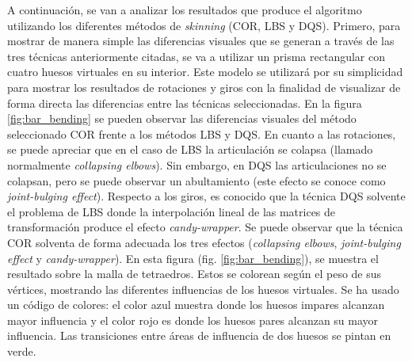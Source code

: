 




A continuación, se van a analizar los resultados que produce el algoritmo utilizando los diferentes métodos de \emph{skinning} (\ac{COR}, \ac{LBS} y \ac{DQS}).
%
Primero, para mostrar de manera simple las diferencias visuales que se generan a través de las tres técnicas anteriormente citadas, se va a utilizar un prisma rectangular con cuatro huesos virtuales en su interior. Este modelo  se utilizará por su simplicidad para mostrar los resultados de rotaciones y giros con la finalidad de visualizar de forma directa las diferencias entre las técnicas seleccionadas. En la figura \ref{fig:bar_bending} se pueden observar las diferencias visuales del método seleccionado \ac{COR} frente a los métodos \ac{LBS} y \ac{DQS}. En cuanto a las rotaciones, se puede apreciar que en el caso de \ac{LBS} la articulación se colapsa (llamado normalmente \emph{collapsing elbows}). Sin embargo, en \ac{DQS} las articulaciones no se colapsan, pero se puede observar un abultamiento (este efecto se conoce como \emph{joint-bulging effect}). Respecto a los giros, es conocido que la técnica \ac{DQS} solvente el problema de \ac{LBS} donde la interpolación lineal de las matrices de transformación produce el efecto \emph{candy-wrapper}. Se puede observar que la técnica \ac{COR} solventa de forma adecuada los tres efectos (\emph{collapsing elbows}, \emph{joint-bulging effect} y \emph{candy-wrapper}). 
En esta figura (fig. \ref{fig:bar_bending}), se muestra el resultado sobre la malla de tetraedros. Estos se colorean según el peso de sus vértices, mostrando las diferentes influencias de los huesos virtuales. Se ha usado un código de colores: el color azul muestra donde los huesos impares alcanzan mayor influencia y el color rojo es donde los huesos pares alcanzan su mayor influencia. %
Las transiciones entre áreas de influencia de dos huesos se pintan en verde.

